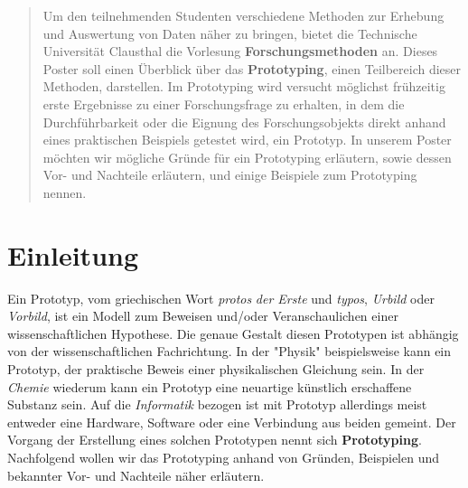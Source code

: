 \documentclass[a0,portrait]{a0poster}
\begin{document}
\begin{multicols}{2} %


\color{Green} %

\begin{abstract}
Um den teilnehmenden Studenten verschiedene Methoden zur Erhebung und Auswertung von Daten näher zu bringen, bietet die Technische Universität Clausthal die Vorlesung \textbf{Forschungsmethoden} an. Dieses Poster soll einen Überblick über das \textbf{Prototyping}, einen Teilbereich dieser Methoden, darstellen. Im Prototyping wird versucht möglichst frühzeitig erste Ergebnisse zu einer Forschungsfrage zu erhalten, in dem die Durchführbarkeit oder die Eignung des Forschungsobjekts direkt anhand eines praktischen Beispiels getestet wird, ein Prototyp.
In unserem Poster möchten wir mögliche Gründe für ein Prototyping erläutern, sowie dessen Vor- und Nachteile erläutern, und einige Beispiele zum Prototyping nennen.
\end{abstract}


\color{Black} %

\section*{Einleitung}
    Ein Prototyp, vom griechischen Wort \textit{protos} \textit{der Erste} und \textit{typos}, \textit{Urbild} oder \textit{Vorbild}, ist ein Modell zum Beweisen und/oder Veranschaulichen einer wissenschaftlichen Hypothese. Die genaue Gestalt diesen Prototypen ist abhängig von der wissenschaftlichen Fachrichtung. In der "Physik" beispielsweise kann ein Prototyp, der praktische Beweis einer physikalischen Gleichung sein. In der \textit{Chemie} wiederum kann ein Prototyp eine neuartige künstlich erschaffene Substanz sein. Auf die \textit{Informatik} bezogen ist mit Prototyp allerdings meist entweder eine Hardware, Software oder eine Verbindung aus beiden gemeint. Der Vorgang der Erstellung eines solchen Prototypen nennt sich \textbf{Prototyping}. Nachfolgend wollen wir das Prototyping anhand von Gründen, Beispielen und bekannter Vor- und Nachteile näher erläutern.


\end{multicols}
\end{document}
